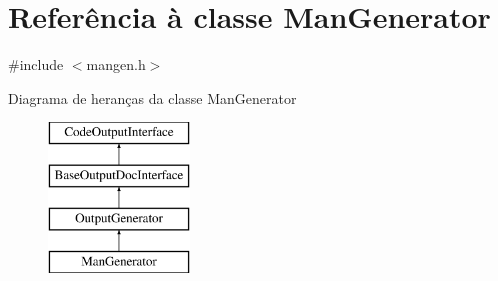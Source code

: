 \hypertarget{class_man_generator}{\section{Referência à classe Man\-Generator}
\label{class_man_generator}
}


{\ttfamily \#include $<$mangen.\-h$>$}

Diagrama de heranças da classe Man\-Generator\begin{figure}[H]
\begin{center}
\leavevmode
\includegraphics[height=4.000000cm]{class_man_generator}
\end{center}
\end{figure}
